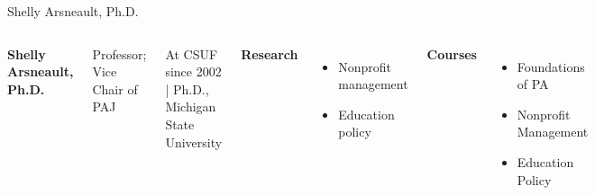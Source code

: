 \documentclass[10pt]{beamer}
\newlength{\imageheight}
\begin{document}
\begin{frame}{Shelly Arsneault, Ph.D.}
\begin{columns}[T,onlytextwidth]
    \raggedright
    {\large\bfseries Shelly Arsneault, Ph.D.}\par
    {Professor; Vice Chair of PAJ}\par
    {\footnotesize At CSUF since 2002 \quad | \quad Ph.D., Michigan State University}\par\vspace{0.4em}

    \textbf{Research}
    \begin{itemize}
      \item Nonprofit management
      \item Education policy
    \end{itemize}

    \textbf{Courses}
    \begin{itemize}
      \item Foundations of PA
      \item Nonprofit Management
      \item Education Policy
    \end{itemize}

    \vspace*{0.25cm}
    \includegraphics[height=\imageheight]{images/arsneault.png}
\end{columns}
\end{frame}
\end{document}
